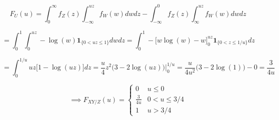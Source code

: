 \begin{itemize}
\[
F_U(u)=\int_0^\infty f_Z(z) \int_{-\infty}^{uz} f_W(w) dw dz - \int_{-\infty}^0 f_Z(z) \int_{\infty}^ {uz} f_W(w) dw dz
\]

\[
=\int_0^1  \int_{0}^{uz} - \log(w)  \boldsymbol{1}_{\{0 < uz \leq 1\}} dw dz  =\int_0^1   - \big[ w \log(w) - w \big]_0^{uz} \boldsymbol{1}_{\{0 < z \leq 1/u\}}  dz  
\]

\[
=\int_0^{1/u} uz  \big[1  - \log(uz)  \big] dz = \frac{u}{4}z^2\big( 3 - 2 \log(uz) \big) \bigg|_0^{1/u}  = \frac{u}{4u^2}\big( 3 - 2 \log(1) \big) - 0 = \frac{3}{4u}
\]

\[
\implies \boxed{ F_{XY/Z}(u) =  \begin{cases} 
     0   & u \leq 0 \\
     \frac{3}{4u} & 0 < u \leq 3/4 \\
     1 & u > 3/4
     \end{cases}}
\]

\end{itemize}


%
%
%
%
%
%
%
%

%



